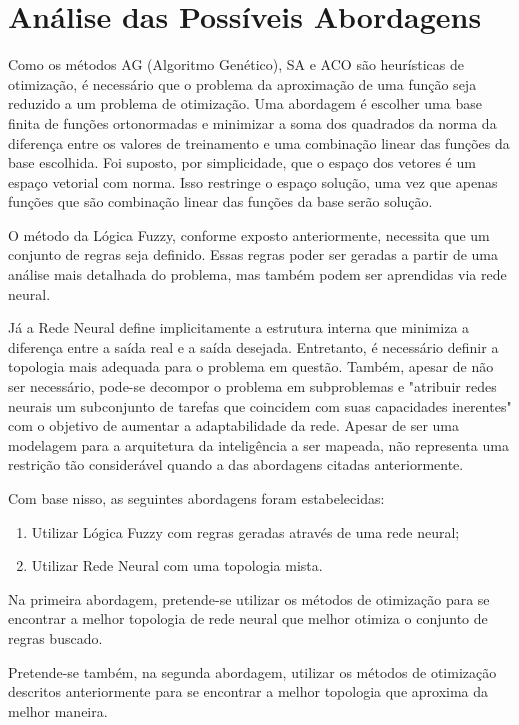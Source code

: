 \chapter{Análise das Possíveis Abordagens}\label{cap:anal_abordagens}


Como os métodos AG (Algoritmo Genético),
SA e ACO são heurísticas de otimização, é necessário que o problema da aproximação
de uma função seja reduzido a um problema de otimização. Uma abordagem é escolher uma
base finita de funções ortonormadas e minimizar a soma dos quadrados da norma da diferença
entre os valores de treinamento e uma combinação linear das funções da base escolhida.
Foi suposto, por simplicidade, que o espaço dos vetores é um espaço vetorial com norma. Isso restringe o
espaço solução, uma vez que apenas funções que são combinação linear das funções da base serão solução.

O método da Lógica Fuzzy, conforme exposto anteriormente, necessita que um conjunto de regras seja definido.
Essas regras poder ser geradas a partir de uma análise mais detalhada do problema, mas também podem ser
aprendidas via rede neural.

Já a Rede Neural define implicitamente a estrutura interna
que minimiza a diferença entre a saída real e a saída desejada.
Entretanto, é necessário definir a topologia mais adequada para o
problema em questão. Também, apesar de não ser necessário, pode-se
decompor o problema em subproblemas e "atribuir redes neurais um
subconjunto de tarefas que coincidem com suas capacidades
inerentes" \cite[pag. 29]{haykin2001redes} com o objetivo de aumentar a
adaptabilidade da rede. Apesar de ser uma modelagem para a arquitetura
da inteligência a ser mapeada, não representa uma restrição tão
considerável quando a das abordagens citadas anteriormente.

Com base nisso, as seguintes abordagens foram estabelecidas:

\begin{enumerate}
 \item Utilizar Lógica Fuzzy com regras geradas através de uma rede neural;
 \item Utilizar Rede Neural com uma topologia mista.
\end{enumerate}

Na primeira abordagem, pretende-se utilizar os métodos de otimização para se
encontrar a melhor topologia de rede neural que melhor otimiza o conjunto de
regras buscado.

Pretende-se também, na segunda abordagem, utilizar os métodos de otimização
descritos anteriormente para se encontrar a melhor topologia que aproxima da
melhor maneira.


